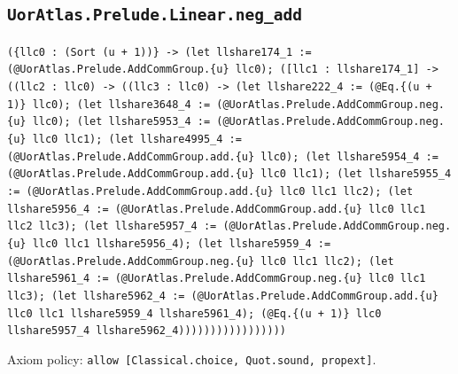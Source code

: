 \documentclass[11pt]{article}
\begin{document}
\subsection*{\texttt{UorAtlas.Prelude.Linear.neg\_add}}
\noindent\texttt{(\{llc0 : (Sort (u + 1))\} -> (let llshare174\_1 := (@UorAtlas.Prelude.AddCommGroup.\{u\} llc0); ([llc1 : llshare174\_1] -> ((llc2 : llc0) -> ((llc3 : llc0) -> (let llshare222\_4 := (@Eq.\{(u + 1)\} llc0); (let llshare3648\_4 := (@UorAtlas.Prelude.AddCommGroup.neg.\{u\} llc0); (let llshare5953\_4 := (@UorAtlas.Prelude.AddCommGroup.neg.\{u\} llc0 llc1); (let llshare4995\_4 := (@UorAtlas.Prelude.AddCommGroup.add.\{u\} llc0); (let llshare5954\_4 := (@UorAtlas.Prelude.AddCommGroup.add.\{u\} llc0 llc1); (let llshare5955\_4 := (@UorAtlas.Prelude.AddCommGroup.add.\{u\} llc0 llc1 llc2); (let llshare5956\_4 := (@UorAtlas.Prelude.AddCommGroup.add.\{u\} llc0 llc1 llc2 llc3); (let llshare5957\_4 := (@UorAtlas.Prelude.AddCommGroup.neg.\{u\} llc0 llc1 llshare5956\_4); (let llshare5959\_4 := (@UorAtlas.Prelude.AddCommGroup.neg.\{u\} llc0 llc1 llc2); (let llshare5961\_4 := (@UorAtlas.Prelude.AddCommGroup.neg.\{u\} llc0 llc1 llc3); (let llshare5962\_4 := (@UorAtlas.Prelude.AddCommGroup.add.\{u\} llc0 llc1 llshare5959\_4 llshare5961\_4); (@Eq.\{(u + 1)\} llc0 llshare5957\_4 llshare5962\_4)))))))))))))))))}\par
\noindent Axiom policy: \texttt{allow [Classical.choice, Quot.sound, propext]}.\par
\end{document}
